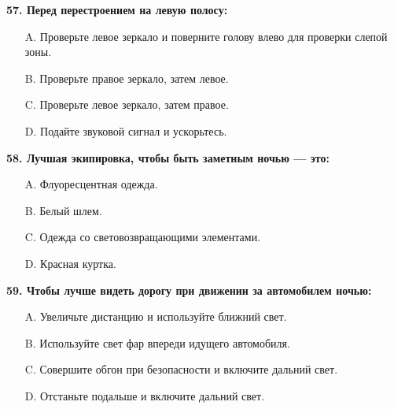 \begin{minipage}{\linewidth}
\vspace{1em}\noindent\textbf{57. Перед перестроением на левую полосу:}

\begin{itemize}[nosep,leftmargin=2em]
\item [A.] Проверьте левое зеркало и поверните голову влево для проверки слепой зоны.
\item [B.] Проверьте правое зеркало, затем левое.
\item [C.] Проверьте левое зеркало, затем правое.
\item [D.] Подайте звуковой сигнал и ускорьтесь.

\end{itemize}
\end{minipage}


\begin{minipage}{\linewidth}
\vspace{1em}\noindent\textbf{58. Лучшая экипировка, чтобы быть заметным ночью — это:}

\begin{itemize}[nosep,leftmargin=2em]
\item [A.] Флуоресцентная одежда.
\item [B.] Белый шлем.
\item [C.] Одежда со световозвращающими элементами.
\item [D.] Красная куртка.

\end{itemize}
\end{minipage}


\begin{minipage}{\linewidth}
\vspace{1em}\noindent\textbf{59. Чтобы лучше видеть дорогу при движении за автомобилем ночью:}

\begin{itemize}[nosep,leftmargin=2em]
\item [A.] Увеличьте дистанцию и используйте ближний свет.
\item [B.] Используйте свет фар впереди идущего автомобиля.
\item [C.] Совершите обгон при безопасности и включите дальний свет.
\item [D.] Отстаньте подальше и включите дальний свет.

\end{itemize}
\end{minipage}


